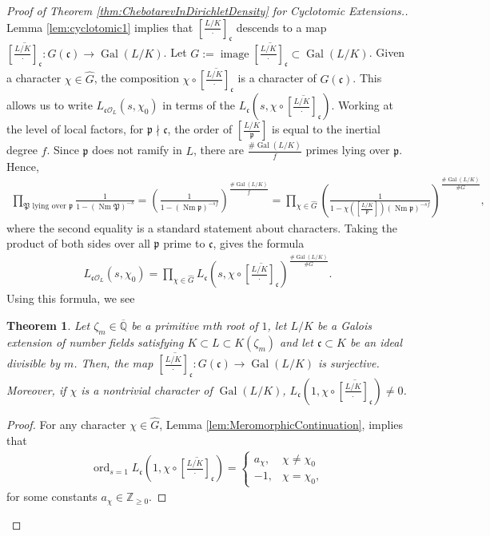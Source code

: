 \documentclass[12pt]{amsart}
\newtheorem{thm}{Theorem}[section]
\theoremstyle{definition}
\theoremstyle{remark}
\numberwithin{equation}{section}
\newcommand{\cO}{\mathcal O}
\newcommand{\fkc}{\mathfrak c}
\newcommand{\fkp}{\mathfrak p}
\newcommand{\fkP}{\mathfrak{P}}
\newcommand{\bbQ}{\mathbb Q}
\newcommand{\bbZ}{\mathbb Z}
\DeclareMathOperator{\norm}{Nm}
\DeclareMathOperator{\image}{image}
\newcommand{\artin}[2]{\left[ \frac{#1}{#2}\right]}
\DeclareMathOperator{\Gal}{Gal}
\DeclareMathOperator{\ord}{ord}
\begin{document}
\begin{proof}[Proof of Theorem \ref{thm:ChebotarevInDirichletDensity} for Cyclotomic Extensions.]
Lemma \ref{lem:cyclotomic1} implies that $\artin{L/K}{\cdot}_{\fkc}$ descends to a map $\overline{\artin{L/K}{\cdot}_{\fkc}}: G(\fkc) \to \Gal(L/K)$. Let $G := \image\overline{\artin{L/K}{\cdot}_{\fkc}} \subset \Gal(L/K)$. Given a character $\chi \in \widehat{G}$, the composition $\chi \circ \overline{\artin{L/K}{\cdot}_{\fkc}}$ is a character of $G(\fkc)$. This allows us to write $L_{\fkc \cO_{L}}(s,\chi_{0})$ in terms of the $L_{\fkc}\left(s, \chi \circ \overline{\artin{L/K}{\cdot}_{\fkc}}\right).$
Working at the level of local factors, for $\fkp\nmid \fkc$, the order of $\artin{L/K}{\fkp}$ is equal to the inertial degree $f$. Since $\fkp$ does not ramify in $L$, there are $\frac{\# \Gal(L/K)}{f}$ primes lying over $\fkp$. Hence,
\begin{align}
\prod_{\fkP \text{ lying over } \fkp} \frac{1}{1 - (\norm \fkP)^{-s}} = \left( \frac{1}{1 - (\norm \fkp)^{-sf}}\right)^{\frac{\# \Gal(L/K)}{f}} = \prod_{\chi \in \widehat{G}} \left( \frac{1}{1 - \chi\left( \artin{L/K}{\fkp}\right)(\norm \fkp)^{-sf}}\right)^{\frac{\# \Gal(L/K)}{\# G}},
\end{align} 
where the second equality is a standard statement about characters.
Taking the product of both sides over all $\fkp$ prime to $\fkc$, gives the formula
\begin{align} \label{eqn:ProductFromLowerField}
L_{\fkc\cO_{L}}(s, \chi_{0}) = \prod_{\chi \in \widehat{G}} L_{\fkc}\left(s, \chi \circ \overline{\artin{L/K}{\cdot}_{\fkc}} \right)^{\frac{\# \Gal(L/K)}{\# G}}.
\end{align} 
Using this formula, we see 
\begin{thm}
Let $\zeta_{m} \in \overline{\bbQ}$ be a primitive $m$th root of $1$, let $L/K$ be a Galois extension of number fields satisfying $K \subset L \subset K(\zeta_{m})$ and let $\fkc \subset K$ be an ideal divisible by $m$. Then, the map $\overline{\artin{L/K}{\cdot}_{\fkc}}: G(\fkc) \to \Gal(L/K)$ is surjective. \\
Moreover, if $\chi$ is a nontrivial character of $\Gal(L/K)$, $L_{\fkc}\left(1, \chi \circ \overline{\artin{L/K}{\cdot}_{\fkc}} \right) \neq 0$.
\end{thm}
\begin{proof}
For any character $\chi \in \widehat{G}$, Lemma \ref{lem:MeromorphicContinuation}, implies that 
\begin{align} \label{eqn:OrderAt1}
\ord_{s = 1} L_{\fkc}\left(1, \chi \circ \overline{\artin{L/K}{\cdot}_{\fkc}} \right) = \begin{cases} a_{\chi},&  \chi \neq \chi_{0} \\ -1, & \chi = \chi_{0}, \end{cases}
\end{align} 
for some constants $a_{\chi} \in \bbZ_{\geq 0}$.


\end{proof}
\end{proof}
\end{document}
